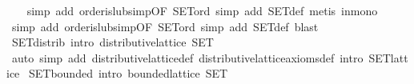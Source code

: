 \begin{isabellebody}
\ \ \isamarkupfalse%
\ {}simp\ add{}\ order{}is{}lub{}simp{}OF\ SET{}ord{}{}\ simp\ add{}\ SET{}def{}\ metis\ in{}mono{}\isanewline
\ \ \isamarkupfalse%
\ {}simp\ add{}\ order{}is{}lub{}simp{}OF\ SET{}ord{}{}\ simp\ add{}\ SET{}def{}\ blast{}\isanewline
\ \ \isamarkupfalse%
%
\endisatagproof
{\isafoldproof}%
%
\isadelimproof
\isanewline
%
\endisadelimproof
\isanewline
{}\isamarkupfalse%
\ SET{}distrib\ {}intro{}{}\ {}distributive{}lattice\ SET{}\isanewline
%
\isadelimproof
\ \ %
\endisadelimproof
%
\isatagproof
{}\isamarkupfalse%
\ {}auto\ simp\ add{}\ distributive{}lattice{}def\ distributive{}lattice{}axioms{}def\ intro{}\ SET{}lattice{}%
\endisatagproof
{\isafoldproof}%
%
\isadelimproof
\isanewline
%
\endisadelimproof
\isanewline
{}\isamarkupfalse%
\ SET{}bounded\ {}intro{}{}\ {}bounded{}lattice\ SET{}\isanewline

\end{isabellebody}
